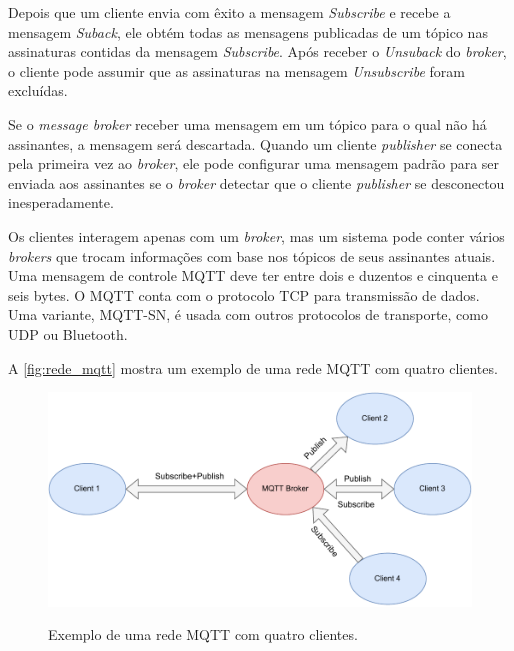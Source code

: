Depois que um cliente envia com êxito a mensagem \textit{Subscribe} e recebe a mensagem \textit{Suback}, ele obtém todas as mensagens publicadas de um tópico nas assinaturas contidas da mensagem \textit{Subscribe}. Após receber o \textit{Unsuback} do \textit{broker}, o cliente pode assumir que as assinaturas na mensagem \textit{Unsubscribe} foram excluídas.

Se o \textit{message broker} receber uma mensagem em um tópico para o qual não há assinantes, a mensagem será descartada. Quando um cliente \textit{publisher} se conecta pela primeira vez ao \textit{broker}, ele pode configurar uma mensagem padrão para ser enviada aos assinantes se o \textit{broker} detectar que o cliente \textit{publisher} se desconectou inesperadamente.

Os clientes interagem apenas com um \textit{broker}, mas um sistema pode conter vários \textit{brokers} que trocam informações com base nos tópicos de seus assinantes atuais. Uma mensagem de controle MQTT deve ter entre dois e duzentos e cinquenta e seis bytes. O MQTT conta com o protocolo TCP para transmissão de dados. Uma variante, MQTT-SN, é usada com outros protocolos de transporte, como UDP ou Bluetooth.

A \autoref{fig:rede_mqtt} mostra um exemplo de uma rede MQTT com quatro clientes.

\begin{figure}[htbp]
    \centering
    \caption{Exemplo de uma rede MQTT com quatro clientes.}
    \includegraphics[scale=0.7]{Imagens/mqtt_protocol.pdf}
    \label{fig:rede_mqtt}
\end{figure}

